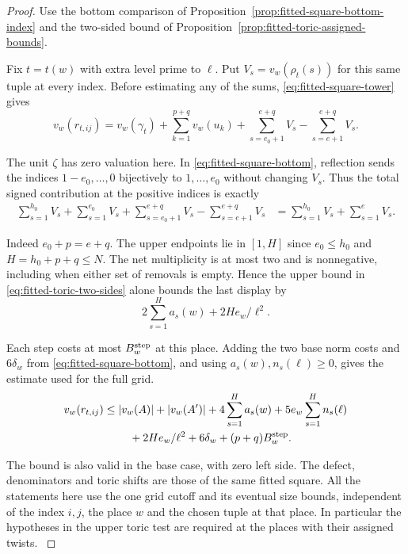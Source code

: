 \begin{proof}

Use the bottom comparison of Proposition~\ref{prop:fitted-square-bottom-index}
and the two-sided bound of Proposition~\ref{prop:fitted-toric-assigned-bounds}.

Fix \(t=t(w)\) with extra level prime to \(\ell\). Put
\(V_s=v_w(\rho_t(s))\) for this same tuple at every index. Before
estimating any of the sums, \eqref{eq:fitted-square-tower} gives
\[
 v_w(r_{t,ij})=v_w(\gamma_t)+\sum_{k=1}^{p+q}v_w(u_k)
       +\sum_{s=e_0+1}^{e+q}V_s-\sum_{s=e+1}^{e+q}V_s .
\]

The unit \(\zeta\) has zero valuation here. In
\eqref{eq:fitted-square-bottom}, reflection sends the indices
\(1-e_0,\ldots,0\) bijectively to \(1,\ldots,e_0\) without
changing \(V_s\). Thus the total signed contribution at the positive
indices is exactly
\[
\begin{aligned}
 \sum_{s=1}^{h_0}V_s+\sum_{s=1}^{e_0}V_s
 +\sum_{s=e_0+1}^{e+q}V_s-\sum_{s=e+1}^{e+q}V_s
 &=\sum_{s=1}^{h_0}V_s+\sum_{s=1}^{e}V_s .
\end{aligned}
\]

Indeed \(e_0+p=e+q\). The upper endpoints lie in
\([1,H]\) since \(e_0\le h_0\) and \(H=h_0+p+q\le N\).
The net multiplicity is at most two and is nonnegative,
including when either set of removals is empty. Hence the upper
bound in \eqref{eq:fitted-toric-two-sides} alone bounds the last
display by
\[
 2\sum_{s=1}^H a_s(w)+2H e_w/\ell^2 .
\]

Each step costs at most \(B_w^{\rm step}\) at this place. Adding
the two base norm costs and \(6\delta_w\) from
\eqref{eq:fitted-square-bottom}, and using \(a_s(w),n_s(\ell)\ge0\),
gives the estimate used for the full grid.
\begin{align}\label{eq:fitted-square-valuation}
 v_w(r_{t,ij})\le{}&
   |v_w(A)|+|v_w(A')|+4\sum_{s=1}^{H}a_s(w)
       +5e_w\sum_{s=1}^{H}n_s(\ell)\\
 &\quad+2H e_w/\ell^2+6\delta_w+(p+q)B_w^{\rm step}.\notag
\end{align}

The bound is also valid in the base case, with zero left side.
The defect, denominators and toric shifts are those of the
same fitted square. All the statements here use the one
grid cutoff and its eventual size bounds, independent of the
index \(i,j\), the place \(w\) and the chosen tuple at that place.
In particular the hypotheses in the upper toric test are
required at the places with their assigned twists.
\label{cor:fitted-square-ratios-7}
\end{proof}
